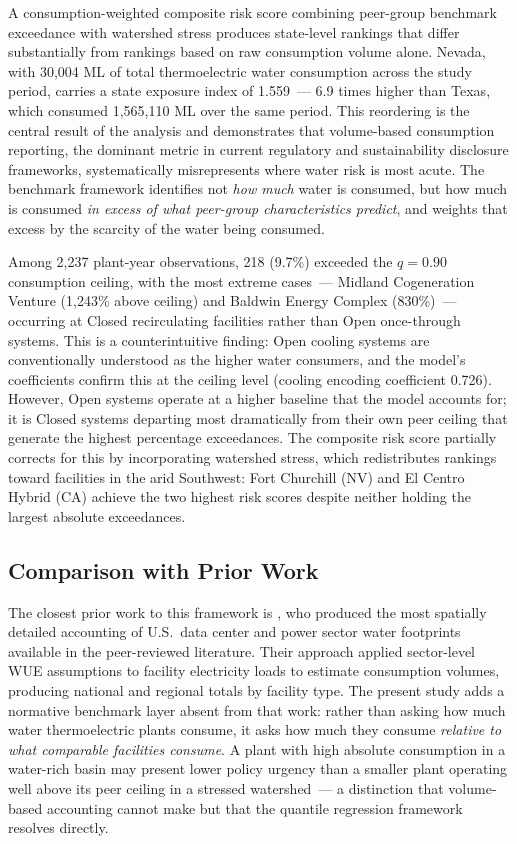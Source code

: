 \documentclass[11pt, letterpaper]{article}
\begin{document}
A consumption-weighted composite risk score combining peer-group benchmark exceedance with watershed stress produces state-level rankings that differ substantially from rankings based on raw consumption volume alone. Nevada, with 30{,}004 ML of total thermoelectric water consumption across the study period, carries a state exposure index of 1.559~--- 6.9 times higher than Texas, which consumed 1{,}565{,}110 ML over the same period. This reordering is the central result of the analysis and demonstrates that volume-based consumption reporting, the dominant metric in current regulatory and sustainability disclosure frameworks, systematically misrepresents where water risk is most acute. The benchmark framework identifies not \textit{how much} water is consumed, but how much is consumed \textit{in excess of what peer-group characteristics predict}, and weights that excess by the scarcity of the water being consumed.

Among 2{,}237 plant-year observations, 218 (9.7\%) exceeded the $q = 0.90$ consumption ceiling, with the most extreme cases~--- Midland Cogeneration Venture (1{,}243\% above ceiling) and Baldwin Energy Complex (830\%)~--- occurring at Closed recirculating facilities rather than Open once-through systems. This is a counterintuitive finding: Open cooling systems are conventionally understood as the higher water consumers, and the model's coefficients confirm this at the ceiling level (cooling encoding coefficient 0.726). However, Open systems operate at a higher baseline that the model accounts for; it is Closed systems departing most dramatically from their own peer ceiling that generate the highest percentage exceedances. The composite risk score partially corrects for this by incorporating watershed stress, which redistributes rankings toward facilities in the arid Southwest: Fort Churchill (NV) and El Centro Hybrid (CA) achieve the two highest risk scores despite neither holding the largest absolute exceedances.

\subsection{Comparison with Prior Work}

The closest prior work to this framework is \citep{siddik2021}, who produced the most spatially detailed accounting of U.S.\ data center and power sector water footprints available in the peer-reviewed literature. Their approach applied sector-level WUE assumptions to facility electricity loads to estimate consumption volumes, producing national and regional totals by facility type. The present study adds a normative benchmark layer absent from that work: rather than asking how much water thermoelectric plants consume, it asks how much they consume \textit{relative to what comparable facilities consume}. A plant with high absolute consumption in a water-rich basin may present lower policy urgency than a smaller plant operating well above its peer ceiling in a stressed watershed~--- a distinction that volume-based accounting cannot make but that the quantile regression framework resolves directly.
\end{document}
